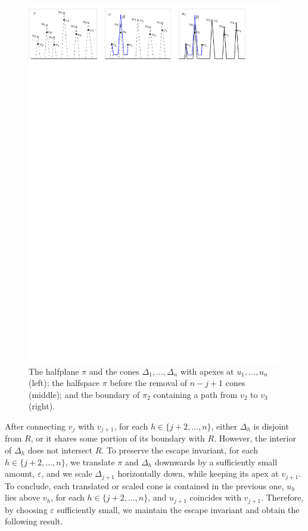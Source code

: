 \documentclass{patmorin}
\begin{document}
\begin{figure}[tb]
\centering
\includegraphics[width=.98\textwidth]{img/DentedHalfspace.pdf}
\caption{\small The halfplane $\pi$ and the cones $\Delta_1,\ldots,\Delta_n$ with apexes at $u_1,\ldots,u_n$ (left);
the halfspace $\pi$ before the removal of $n-j+1$ cones (middle); and the boundary of $\pi_2$ containing a path from $v_2$ to $v_3$  (right).}
\label{fig:Dented Halfspace}
\end{figure}


After connecting $v_j$ with $v_{j+1}$, for each $h\in\{j{+}2,\ldots,n\}$, either $\Delta_h$ is disjoint from $R$, or it shares some portion of its boundary with $R$. However, the interior of $\Delta_h$ does not intersect $R$.
To preserve the escape invariant, for each $h\in\{j{+}2,\ldots,n\}$, we translate $\pi$ and $\Delta_h$ downwards by a sufficiently small amount, $\varepsilon$, and we scale $\Delta_{j+1}$ horizontally down, while keeping its apex at $v_{j+1}$. To conclude, each translated or scaled cone is contained in the previous one, $u_h$ lies above $v_h$, for each $h\in\{j+2,\ldots,n\}$, and $u_{j+1}$ coincides with $v_{j+1}$. Therefore, by choosing $\varepsilon$ sufficiently small, we maintain the escape invariant and obtain the following result.
\end{document}
